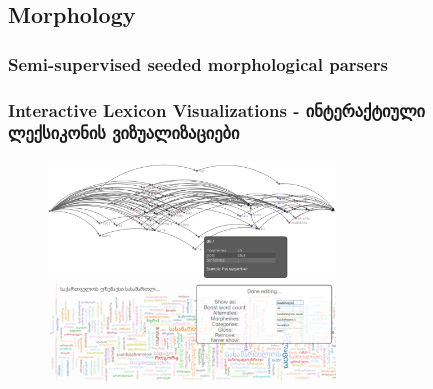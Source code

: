 \documentclass{beamer}
\begin{document}
\subsection{Morphology}



%
%





\subsubsection[DataViz]{Semi-supervised seeded morphological parsers}

\begin{frame}

\frametitle{\large Interactive Lexicon Visualizations - ინტერაქტიული ლექსიკონის ვიზუალიზაციები}

\begin{figure}
\begin{center}
\includegraphics[width=3in]{../figures/lexicon_browser}\\
\includegraphics[width=3in]{../figures/lexicon_browser2}
\label{lexicon_browser_screenshot}
\end{center}
\end{figure}

\end{frame}
\end{document}
